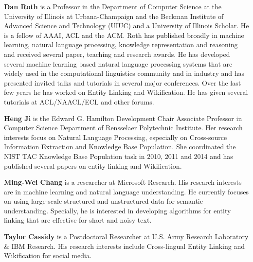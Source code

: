 \begin{bio}
\small

{\bfseries Dan Roth} is a Professor in the Department of Computer Science at the University of Illinois at Urbana-Champaign and the Beckman Institute of Advanced Science and Technology (UIUC) and a University of Illinois Scholar. He is a fellow of AAAI, ACL and the ACM. Roth has published broadly in machine learning, natural language processing, knowledge representation and reasoning and received several paper, teaching and research awards. He has developed several machine learning based natural language processing systems that are widely used in the computational linguistics community and in industry and has presented invited talks and tutorials in several major conferences. Over the last few years he has worked on Entity Linking and Wikification. He has given several tutorials at ACL/NAACL/ECL and other forums.

{\bfseries Heng Ji} is the Edward G. Hamilton Development Chair Associate Professor in Computer Science Department of Rensselaer Polytechnic Institute. Her research interests focus on Natural Language Processing, especially on Cross-source Information Extraction and Knowledge Base Population. She coordinated the NIST TAC Knowledge Base Population task in 2010, 2011 and 2014 and has published several papers on entity linking and Wikification.

{\bfseries Ming-Wei Chang} is a researcher at Microsoft Research. His research interests are in machine learning and natural language understanding. He currently focuses on using large-scale structured and unstructured data for semantic understanding. Specially, he is interested in developing algorithms for entity linking that are effective for short and noisy text.

{\bfseries Taylor Cassidy} is a Postdoctoral Researcher at U.S. Army Research Laboratory \& IBM Research. His research interests include Cross-lingual Entity Linking and Wikification for social media.
\end{bio}

